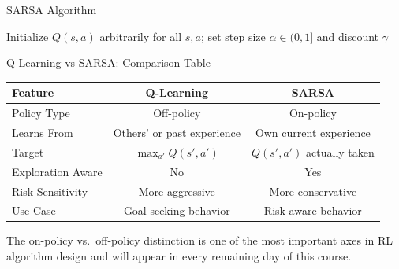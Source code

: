 \begin{frame}{SARSA Algorithm}
    \begin{center}
    \footnotesize
    \begin{algorithm}[H]
        \DontPrintSemicolon
        \caption{SARSA (on-policy TD control)}
        Initialize $Q(s, a)$ arbitrarily for all $s, a$; set step size $\alpha \in (0, 1]$ and discount $\gamma$\;
    \end{algorithm}
    \end{center}
\end{frame}

\begin{frame}{Q-Learning vs SARSA: Comparison Table}
    \begin{table}[h!]
        \centering
        \renewcommand{\arraystretch}{1.8}
        \begin{tabular}{lcc}
            \hline
            \textbf{Feature} & \textbf{Q-Learning} & \textbf{SARSA} \\
            \hline
            Policy Type & Off-policy & On-policy \\
            Learns From & Others' or past experience & Own current experience \\
            Target & $\max_{a'} Q(s', a')$ & $Q(s', a')$ actually taken \\
            Exploration Aware & No & Yes \\
            Risk Sensitivity & More aggressive & More conservative \\
            Use Case & Goal-seeking behavior & Risk-aware behavior \\
            \hline
        \end{tabular}
    \end{table}
    \vspace{0.3em}
    \small The on-policy vs.\ off-policy distinction is one of the most important axes in RL algorithm design and will appear in every remaining day of this course.
\end{frame}